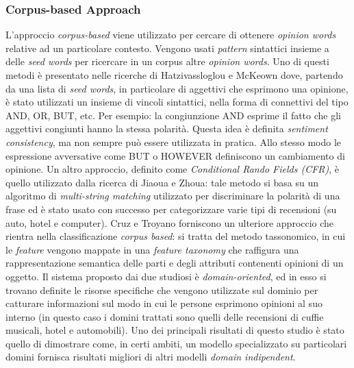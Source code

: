 \documentclass[a4paper,12pt,openright,twoside]{report}
\theoremstyle{definition}
\begin{document}
\subsubsection{Corpus-based Approach}
L'approccio \emph{corpus-based} viene utilizzato per cercare di ottenere \emph{opinion words} relative ad un
particolare contesto. Vengono usati \emph{pattern} sintattici insieme a delle \emph{seed words} per 
ricercare in un corpus
altre \emph{opinion words}.
Uno di questi metodi è presentato nelle ricerche di Hatzivassloglou e McKeown %
dove, partendo da una lista di \emph{seed words}, in particolare di aggettivi che esprimono una opinione,
è stato utilizzati un insieme di vincoli sintattici, nella forma di connettivi del tipo AND, OR, BUT, etc.
Per esempio: la congiunzione AND esprime il fatto che gli aggettivi congiunti hanno la stessa polarità. Questa
idea è definita \emph{sentiment consistency}, ma non sempre può essere utilizzata in pratica. Allo stesso modo
le espressione avversative come BUT o HOWEVER definiscono un cambiamento di opinione.
Un altro approccio, definito come \emph{Conditional Rando Fields (CFR)}, è quello utilizzato dalla ricerca di Jiaoua e Zhoua: %
tale metodo si basa su un algoritmo di \emph{multi-string matching}
utilizzato per discriminare la polarità di una frase ed è stato usato
con successo per
categorizzare varie tipi di recensioni (su auto, hotel e computer).
Cruz e Troyano %
forniscono un ulteriore approccio che rientra nella classificazione \emph{corpus based}:
si tratta del metodo tassonomico, in cui le \emph{feature} vengono mappate in una \emph{feature taxonomy}
che raffigura una rappresentazione semantica delle parti e degli attributi contenenti opinioni
di un oggetto.
Il sistema proposto dai due studiosi  è \emph{domain-oriented}, ed in esso si trovano definite
le risorse specifiche che vengono utilizzate sul dominio per catturare informazioni sul modo 
in cui le persone 
esprimono opinioni al suo interno (in questo caso i domini trattati sono quelli
delle recensioni di cuffie musicali, hotel e automobili).
Uno dei principali risultati di questo studio è stato quello di dimostrare come, in certi ambiti,
un modello specializzato su particolari domini fornisca risultati migliori di altri
modelli \emph{domain indipendent}.
\end{document}
